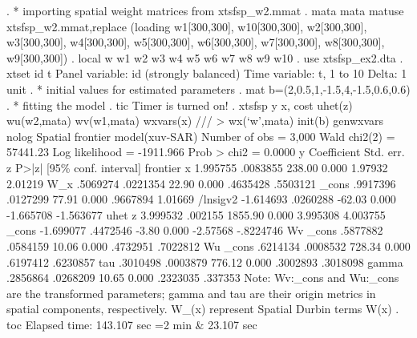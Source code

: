 . * importing spatial weight matrices from xtsfsp_w2.mmat
. mata mata matuse xtsfsp_w2.mmat,replace
(loading w1[300,300], w10[300,300], w2[300,300], w3[300,300], w4[300,300],
 w5[300,300], w6[300,300], w7[300,300], w8[300,300], w9[300,300])
{\smallskip}
. local w w1 w2 w3 w4 w5 w6 w7 w8 w9 w10
{\smallskip}
. use xtsfsp_ex2.dta
{\smallskip}
. xtset id t 
{\smallskip}
Panel variable: id (strongly balanced)
 Time variable: t, 1 to 10
         Delta: 1 unit
{\smallskip}
. * initial values for estimated parameters
. mat b=(2,0.5,1,-1.5,4,-1.5,0.6,0.6)
{\smallskip}
. * fitting the model
. tic
Timer is turned on!
{\smallskip}
. xtsfsp y x, cost uhet(z) wu(w2,mata) wv(w1,mata) wxvars(x) ///
>             wx(`w',mata) init(b) genwxvars nolog
{\smallskip}
Spatial frontier model(xuv-SAR)                       Number of obs =    3,000
                                                      Wald chi2(2)  = 57441.23
Log likelihood = -1911.966                            Prob > chi2   =   0.0000
{\smallskip}
           y {\VBAR} Coefficient  Std. err.      z    P>|z|     [95\% conf. interval]
frontier     {\VBAR}
           x {\VBAR}   1.995755   .0083855   238.00   0.000      1.97932     2.01219
         W_x {\VBAR}   .5069274   .0221354    22.90   0.000     .4635428    .5503121
       _cons {\VBAR}   .9917396   .0127299    77.91   0.000     .9667894     1.01669
    /lnsigv2 {\VBAR}  -1.614693   .0260288   -62.03   0.000    -1.665708   -1.563677
uhet         {\VBAR}
           z {\VBAR}   3.999532    .002155  1855.90   0.000     3.995308    4.003755
       _cons {\VBAR}  -1.699077   .4472546    -3.80   0.000     -2.57568   -.8224746
Wv           {\VBAR}
       _cons {\VBAR}   .5877882   .0584159    10.06   0.000     .4732951    .7022812
Wu           {\VBAR}
       _cons {\VBAR}   .6214134   .0008532   728.34   0.000     .6197412    .6230857
         tau {\VBAR}   .3010498   .0003879   776.12   0.000     .3002893    .3018098
       gamma {\VBAR}   .2856864   .0268209    10.65   0.000     .2323035     .337353
Note: Wv:_cons and Wu:_cons are the transformed parameters;
      gamma and tau are their origin metrics in spatial components, respectively.
      W_(x) represent Spatial Durbin terms W(x)
{\smallskip}
. toc
Elapsed time: 143.107 sec
             =2 min \& 23.107 sec
{\smallskip}
